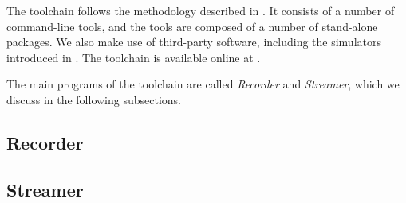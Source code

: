 The toolchain follows the methodology described in . It
consists of a number of command-line tools, and the tools are composed of a
number of stand-alone packages. We also make use of third-party software,
including the simulators introduced in . The toolchain is
available online at \cite{sources}.

The main programs of the toolchain are called \emph{Recorder} and
\emph{Streamer}, which we discuss in the following subsections.

\subsection{Recorder} 


\subsection{Streamer} 

